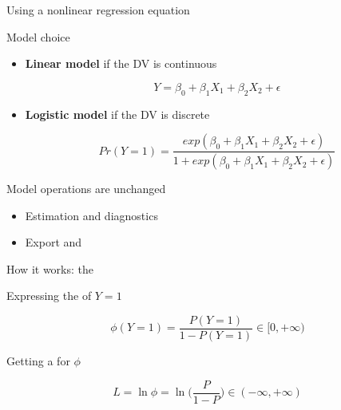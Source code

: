 \documentclass[t]{beamer}
\begin{document}
  \begin{frame}[c]{Using a nonlinear regression equation}
  
	\begin{block}{Model choice}
	
		\begin{itemize}
			\item \textbf{Linear model} if the DV is continuous \hfill %
				
				$$Y = \beta_0 + \beta_1 X_1 + \beta_2 X_2 + \epsilon$$
				
			\item \textbf{Logistic model} if the DV is discrete \hfill %
				
				$$Pr(Y = 1) = \frac{exp(\beta_0 + \beta_1 X_1 + \beta_2 X_2 + \epsilon)}%
				{1 + exp(\beta_0 + \beta_1 X_1 + \beta_2 X_2 + \epsilon)}$$
				
		\end{itemize}

	\end{block}

	\begin{block}{Model operations are unchanged}

		\begin{itemize}
			\item Estimation and diagnostics
			\item Export and 
		\end{itemize}
		
	\end{block}
	
  \end{frame}

  \begin{frame}[c]{How it works: the }

    \begin{block}{Expressing the  of $Y = 1$}

      $$\phi (Y = 1) = \frac{P(Y=1)}{1-P(Y=1)} \in [0, + \infty)$$

    \end{block}

    \begin{block}{Getting a  for $\phi$}

      $$L = \ln \phi = \ln \bigg( \frac{P}{1-P} \bigg) \in (-\infty, +\infty)$$

    \end{block}

  \end{frame}
\end{document}
